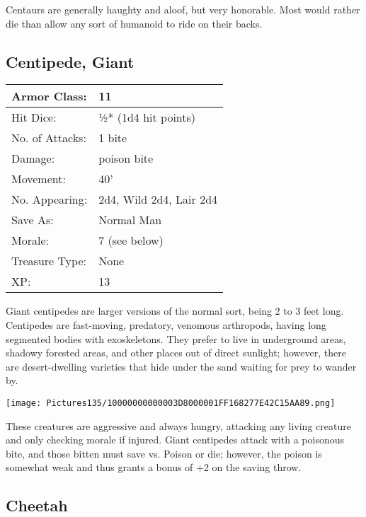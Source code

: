 \documentclass[a4paper,twoside,openany,10pt]{book}
\begin{document}
\begin{multicols}{2}
Centaurs are generally haughty and aloof, but very honorable. Most would rather die than allow any sort of humanoid to ride on their backs.


\subsection*{Centipede, Giant}\label{centipede-giant}

\begin{tabularx}{0.48\textwidth}{@{}lX@{}}
Armor Class: & 11 \\\hline
Hit Dice: & ½* (1d4 hit points) \\\hline
No. of Attacks: & 1 bite \\\hline
Damage: & poison bite \\\hline
Movement: & 40' \\\hline
No. Appearing: & 2d4, Wild 2d4, Lair 2d4 \\\hline
Save As: & Normal Man \\\hline
Morale: & 7 (see below) \\\hline
Treasure Type: & None \\\hline
XP: & 13 \\\hline
\end{tabularx}\medskip

Giant centipedes are larger versions of the normal sort, being 2 to 3 feet long. Centipedes are fast-moving, predatory, venomous arthropods, having long segmented bodies with exoskeletons. They prefer to live in underground areas, shadowy forested areas, and other places out of direct sunlight; however, there are desert-dwelling varieties that hide under the sand waiting for prey to wander by.


\begin{center}
	\texttt{[image: Pictures135/10000000000003D8000001FF168277E42C15AA89.png]}
\end{center}

These creatures are aggressive and always hungry, attacking any living creature and only checking morale if injured. Giant centipedes attack with a poisonous bite, and those bitten must save vs. Poison or die; however, the poison is somewhat weak and thus grants a bonus of +2 on the saving throw.


\subsection*{Cheetah}\label{cheetah}


\end{multicols}
\end{document}
